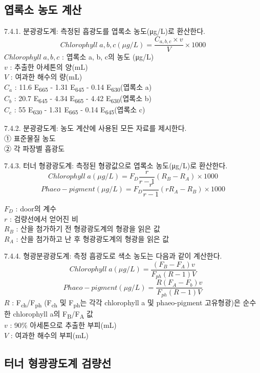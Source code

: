 \documentclass[
]{book}
\begin{document}
\hypertarget{uxc5fduxb85duxc18c-uxb18duxb3c4-uxacc4uxc0b0}{%
\subsection{엽록소 농도 계산}\label{uxc5fduxb85duxc18c-uxb18duxb3c4-uxacc4uxc0b0}}

7.4.1. 분광광도계: 측정된 흡광도를 엽록소 농도(μg/L)로 환산한다.
\[Chlorophyll\;a, b, c (μg/L)=\frac{C_{a,b,c} \times v}{V} \times 1000\]
\(Chlorophyll\;a, b, c\) : 엽록소 a, b, c의 농도 (μg/L)\\
\(v\) : 추출한 아세톤의 양(mL)\\
\(V\) : 여과한 해수의 량(mL)\\
\(C_a\) : 11.6 E\textsubscript{665} - 1.31 E\textsubscript{645} - 0.14 E\textsubscript{630}(엽록소 a)\\
\(C_b\) : 20.7 E\textsubscript{645} - 4.34 E\textsubscript{665} - 4.42 E\textsubscript{630}(엽록소 b)\\
\(C_c\) : 55 E\textsubscript{630} - 1.31 E\textsubscript{665} - 0.14 E\textsubscript{645}(엽록소 c)

7.4.2. 분광광도계: 농도 계산에 사용된 모든 자료를 제시한다.\\
① 표준물질 농도\\
② 각 파장별 흡광도

7.4.3. 터너 형광광도계: 측정된 형광값으로 엽록소 농도(μg/L)로 환산한다.
\[Chlorophyll\;a(μg/L)=F_D\frac{r}{r-1}(R_B-R_A) \times 1000\]
\[Phaeo-pigment(μg/L)=F_D\frac{r}{r-1}(rR_A-R_B) \times 1000\]

\(F_D\) : door의 계수\\
\(r\) : 검량선에서 얻어진 비\\
\(R_B\) : 산을 첨가하기 전 형광광도계의 형광을 읽은 값\\
\(R_A\) : 산을 첨가하고 난 후 형광광도계의 형광을 읽은 값

7.4.4. 형광분광광도계: 측정 흡광도로 색소 농도는 다음과 같이 계산한다.
\[Chlorophyll\;a(μg/L)=\frac{(F_B-F_A)v}{F_{ph}(R-1)V}\]
\[Phaeo-pigment(μg/L)=\frac{R(F_A-F_b)v}{F_{ph}(R-1)V}\]
\(R\) : F\textsubscript{ch}/F\textsubscript{ph} (F\textsubscript{ch} 및 F\textsubscript{ph}는 각각 chlorophyll a 및 phaeo-pigment 고유형광)은 순수한 chlorophyll a의 F\textsubscript{B}/F\textsubscript{A} 값\\
\(v\) : 90\% 아세톤으로 추출한 부피(mL)\\
\(V\) : 여과한 해수의 부피(mL)

\hypertarget{uxd130uxb108-uxd615uxad11uxad11uxb3c4uxacc4-uxac80uxb7c9uxc120}{%
\subsection{터너 형광광도계 검량선}\label{uxd130uxb108-uxd615uxad11uxad11uxb3c4uxacc4-uxac80uxb7c9uxc120}}
\end{document}
